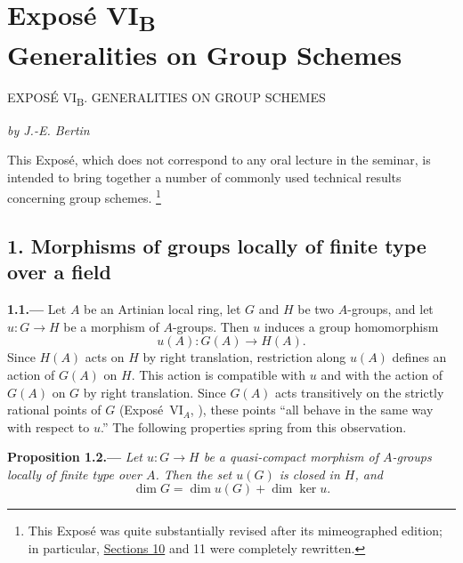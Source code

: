 
\chapter*{Expos\'e \texorpdfstring{VI\textsubscript{B}}{VI_B}\\
Generalities on Group Schemes}
\label{sga3:VIB:title}
%
  {EXPOS\'E VI\textsubscript{B}. GENERALITIES ON GROUP SCHEMES}

\begin{center}
  \textit{by J.-E. Bertin}
\end{center}

This Expos\'e, which does not correspond to any oral lecture in the
seminar, is intended to bring together a number of commonly used
technical results concerning group schemes.%
\begingroup
\renewcommand{\thefootnote}{\fnsymbol{footnote}}%
\footnote[1]{This Expos\'e was quite substantially revised after its
mimeographed edition; in particular, \hyperref[sec:sga3-VIB-10]{Sections 10} and 11 were completely
rewritten.}%
\endgroup

\section*{1. Morphisms of groups locally of finite type over a field}
\label{sec:sga3-VIB-1}

\medskip
{}\label{par:sga3-VIB-1.1}%
\noindent\textbf{1.1.---}
Let \(A\) be an Artinian local ring, let \(G\) and \(H\) be two
\(A\)-groups,
and let \(u:G\to H\) be a morphism of \(A\)-groups. Then \(u\)
induces a group homomorphism
\[
  u(A):G(A)\longrightarrow H(A).
\]%
Since \(H(A)\) acts on \(H\) by right translation, restriction along
\(u(A)\) defines an action of \(G(A)\) on \(H\). This action is
compatible with \(u\) and with the action of \(G(A)\) on \(G\) by
right translation. Since \(G(A)\) acts transitively on the strictly
rational points of \(G\) (Expos\'e~VI\(_A\), ), these points ``all behave in the same way with respect
to \(u\).'' The following properties spring from this observation.

\medskip
{}\label{prop:sga3-VIB-1.2}%
\noindent\textbf{Proposition 1.2.---}
\emph{Let \(u:G\to H\) be a quasi-compact morphism of
\(A\)-groups locally of finite type over \(A\). Then the set
\(u(G)\) is closed in \(H\), and}
\[
  \dim G=\dim u(G)+\dim\ker u.
\]%

